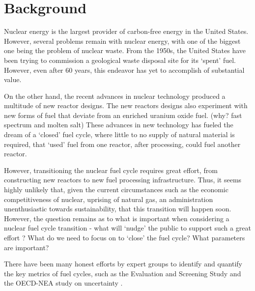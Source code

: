 \documentclass{article}
\begin{document}
\section{Background}
Nuclear energy is the largest provider of carbon-free energy
in the United States. However, several problems remain with nuclear
energy, with one of the biggest one being the problem of nuclear waste.
From the 1950s, the United States have been trying to commission a 
geological waste disposal site for its `spent' fuel. However, even
after 60 years, this endeavor has yet to accomplish of substantial value.

On the other hand, the recent advances in nuclear technology produced
a multitude of new reactor designs. The new reactors designs also 
experiment with new forms of fuel that deviate from an enriched uranium
oxide fuel. (why? fast spectrum and molten salt) These advances in new
technology has fueled the dream of a `closed' fuel cycle, where little to no
supply of natural material is required, that `used' fuel from one reactor,
after processing, could fuel another reactor.

However, transitioning the nuclear fuel cycle requires great effort,
from constructing new reactors to new fuel processing infrastructure.
Thus, it seems highly unlikely that, given the current circumstances
such as the economic competitiveness of nuclear, uprising of natural
gas, an administration unenthusiastic towards sustainability, that 
this transition will happen soon.
However, the question remains as to what is important when considering
a nuclear fuel cycle transition - what will `nudge' the public to 
support such a great effort \cite{leonard_richard_2008}? What do we
need to focus on to `close' the fuel cycle? What parameters are
important?

There have been many honest efforts by expert groups 
to identify and quantify the key metrics of fuel cycles,
 such as the Evaluation and Screening Study
\cite{wigeland_nuclear_2014} and the OECD-NEA study on uncertainty
\cite{hyland_effects_2015}.
\end{document}
